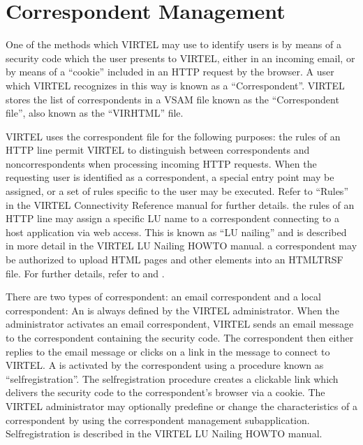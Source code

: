 \documentclass[letterpaper,10pt,english]{sphinxmanual}
\begin{document}
\section{Correspondent Management}
\label{\detokenize{audit_operations_ and_performance:correspondent-management}}\label{\detokenize{audit_operations_ and_performance:index-48}}
\sphinxAtStartPar
One of the methods which VIRTEL may use to identify users is by means of a security code which the user presents to VIRTEL, either in an incoming e\sphinxhyphen{}mail, or by means of a “cookie” included in an HTTP request by the browser. A user which VIRTEL recognizes in this way is known as a “Correspondent”. VIRTEL stores the list of correspondents in a VSAM file known as the “Correspondent file”, also known as the “VIRHTML” file.

\sphinxAtStartPar
VIRTEL uses the correspondent file for the following purposes:
\sphinxhyphen{} the rules of an HTTP line permit VIRTEL to distinguish between correspondents and non\sphinxhyphen{}correspondents when processing incoming HTTP requests. When the requesting user is identified as a correspondent, a special entry point may be assigned, or a set of rules specific to the user may be executed. Refer to “Rules” in the VIRTEL Connectivity Reference manual for further details.
\sphinxhyphen{} the rules of an HTTP line may assign a specific LU name to a correspondent connecting to a host application via web access. This is known as “LU nailing” and is described in more detail in the VIRTEL LU Nailing HOWTO manual.
\sphinxhyphen{} a correspondent may be authorized to upload HTML pages and other elements into an HTMLTRSF file. For further details, refer to {\hyperref[\detokenize{audit_operations_ and_performance:v462ap-http-uploading-pages-smtp}]{}} and {\hyperref[\detokenize{audit_operations_ and_performance:v462ap-http-uploading-pages}]{}}.

\sphinxAtStartPar
There are two types of correspondent: an e\sphinxhyphen{}mail correspondent and a local correspondent:
\sphinxhyphen{} An  is always defined by the VIRTEL administrator. When the administrator activates an email correspondent, VIRTEL sends an e\sphinxhyphen{}mail message to the correspondent containing the security code. The correspondent then either replies to the e\sphinxhyphen{}mail message or clicks on a link in the message to connect to VIRTEL.
\sphinxhyphen{} A  is activated by the correspondent using a procedure known as “self\sphinxhyphen{}registration”. The self\sphinxhyphen{}registration procedure creates a clickable link which delivers the security code to the correspondent’s browser via a cookie. The VIRTEL administrator may optionally pre\sphinxhyphen{}define or change the characteristics of a correspondent by using the correspondent management sub\sphinxhyphen{}application. Self\sphinxhyphen{}registration is described in the VIRTEL LU Nailing HOWTO manual.
\end{document}
